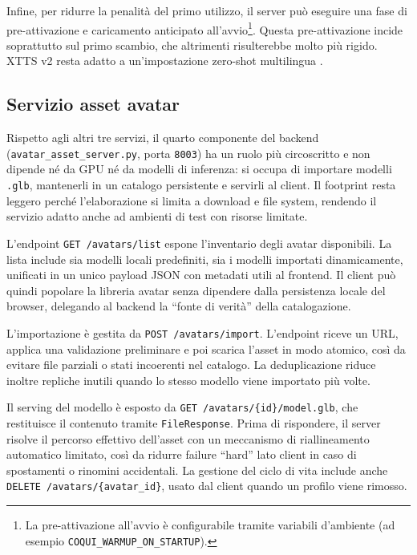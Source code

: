 Infine, per ridurre la penalità del primo utilizzo, il server può eseguire una fase di pre-attivazione e caricamento anticipato all'avvio\footnote{La pre-attivazione all'avvio è configurabile tramite variabili d'ambiente (ad esempio \texttt{COQUI\_WARMUP\_ON\_STARTUP}).}. Questa pre-attivazione incide soprattutto sul primo scambio, che altrimenti risulterebbe molto più rigido. XTTS v2 resta adatto a un'impostazione zero-shot multilingua \cite{Casanova2024XTTS}.

\subsection{Servizio asset avatar}\label{subsec:avatar-asset}

Rispetto agli altri tre servizi, il quarto componente del backend (\texttt{avatar\_asset\_server.py}, porta \texttt{8003}) ha un ruolo più circoscritto e non dipende né da GPU né da modelli di inferenza: si occupa di importare modelli \texttt{.glb}, mantenerli in un catalogo persistente e servirli al client. Il footprint resta leggero perché l'elaborazione si limita a download e file system, rendendo il servizio adatto anche ad ambienti di test con risorse limitate.

L'endpoint \texttt{GET /avatars/list} espone l'inventario degli avatar disponibili. La lista include sia modelli locali predefiniti, sia i modelli importati dinamicamente, unificati in un unico payload JSON con metadati utili al frontend. Il client può quindi popolare la libreria avatar senza dipendere dalla persistenza locale del browser, delegando al backend la ``fonte di verità'' della catalogazione.

L'importazione è gestita da \texttt{POST /avatars/import}. L'endpoint riceve un URL, applica una validazione preliminare e poi scarica l'asset in modo atomico, così da evitare file parziali o stati incoerenti nel catalogo. La deduplicazione riduce inoltre repliche inutili quando lo stesso modello viene importato più volte.

Il serving del modello è esposto da \texttt{GET /avatars/\{id\}/model.glb}, che restituisce il contenuto tramite \texttt{FileResponse}. Prima di rispondere, il server risolve il percorso effettivo dell'asset con un meccanismo di riallineamento automatico limitato, così da ridurre failure ``hard'' lato client in caso di spostamenti o rinomini accidentali. La gestione del ciclo di vita include anche \texttt{DELETE /avatars/\{avatar\_id\}}, usato dal client quando un profilo viene rimosso.

